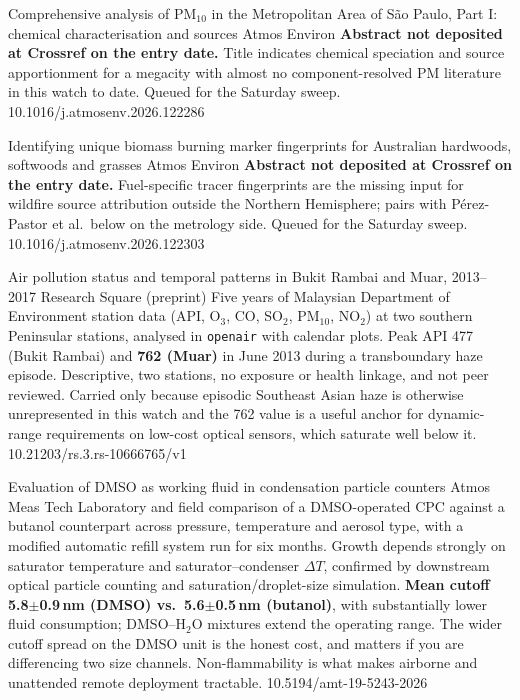 \documentclass[10pt]{article}
\begin{document}
{Comprehensive analysis of PM$_{10}$ in the Metropolitan Area of S\~ao Paulo, Part I:
chemical characterisation and sources}
{Atmos Environ}
{\textbf{Abstract not deposited at Crossref on the entry date.} Title indicates
chemical speciation and source apportionment for a megacity with almost no
component-resolved PM literature in this watch to date. Queued for the Saturday sweep.}
{10.1016/j.atmosenv.2026.122286}

{Identifying unique biomass burning marker fingerprints for Australian hardwoods,
softwoods and grasses}
{Atmos Environ}
{\textbf{Abstract not deposited at Crossref on the entry date.} Fuel-specific tracer
fingerprints are the missing input for wildfire source attribution outside the Northern
Hemisphere; pairs with P\'erez-Pastor et al.\ below on the metrology side. Queued for
the Saturday sweep.}
{10.1016/j.atmosenv.2026.122303}

{Air pollution status and temporal patterns in Bukit Rambai and Muar, 2013--2017}
{Research Square (preprint)}
{Five years of Malaysian Department of Environment station data (API, O$_3$, CO, SO$_2$,
PM$_{10}$, NO$_2$) at two southern Peninsular stations, analysed in \texttt{openair} with
calendar plots. Peak API 477 (Bukit Rambai) and \textbf{762 (Muar)} in June 2013 during a
transboundary haze episode. Descriptive, two stations, no exposure or health linkage, and
not peer reviewed. Carried only because episodic Southeast Asian haze is otherwise
unrepresented in this watch and the 762 value is a useful anchor for dynamic-range
requirements on low-cost optical sensors, which saturate well below it.}
{10.21203/rs.3.rs-10666765/v1}

\clearpage


{Evaluation of DMSO as working fluid in condensation particle counters}
{Atmos Meas Tech}
{Laboratory and field comparison of a DMSO-operated CPC against a butanol counterpart
across pressure, temperature and aerosol type, with a modified automatic refill system
run for six months. Growth depends strongly on saturator temperature and
saturator--condenser $\Delta T$, confirmed by downstream optical particle counting and
saturation/droplet-size simulation. \textbf{Mean cutoff 5.8$\pm$0.9\,nm (DMSO) vs.\
5.6$\pm$0.5\,nm (butanol)}, with substantially lower fluid consumption; DMSO--H$_2$O
mixtures extend the operating range. The wider cutoff spread on the DMSO unit is the
honest cost, and matters if you are differencing two size channels. Non-flammability is
what makes airborne and unattended remote deployment tractable.}
{10.5194/amt-19-5243-2026}
\end{document}
